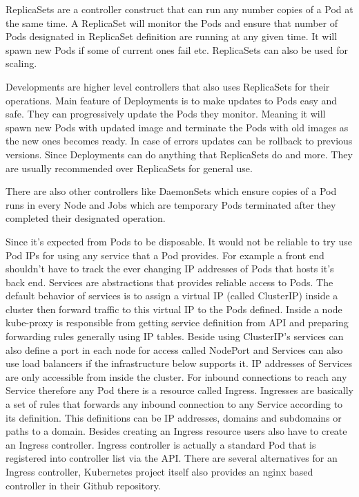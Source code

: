 \documentclass[12pt,oneandhalf,chaparabic,ceng,ms,eng,oneside,pntc]{gsufbe}
\begin{document}
ReplicaSets are a controller construct that can run any number copies of a Pod at the same time.  A 
ReplicaSet will monitor the Pods and ensure that number of Pods designated in ReplicaSet definition are
running at any given time.  It will spawn new Pods if some of current ones fail etc. ReplicaSets can
also be used for scaling.  

Developments are higher level controllers that also uses ReplicaSets for their operations.  Main feature
of Deployments is to make updates to Pods easy and safe.  They can progressively update the Pods they
monitor.  Meaning it will spawn new Pods with updated image and terminate the Pods with old images as
the new ones becomes ready.  In case of errors updates can be rollback to previous versions.  Since
Deployments can do anything that ReplicaSets do and more.  They are usually recommended over ReplicaSets
for general use.

There are also other controllers like DaemonSets which ensure copies of a Pod runs in every Node and
Jobs which are temporary Pods terminated after they completed their designated operation.

Since it’s expected from Pods to be disposable.  It would not be reliable to try use Pod IPs for using
any service that a Pod provides.  For example a front end shouldn’t have to track the ever changing IP
addresses of Pods that hosts it’s back end.  Services are abstractions that provides reliable access to
Pods.  The default behavior of services is to assign a virtual IP (called ClusterIP) inside a cluster
then forward traffic to this virtual IP to the Pods defined.  Inside a node kube-proxy is responsible
from getting service definition from API and preparing forwarding rules generally using IP tables.
Beside using ClusterIP’s services can also define a port in each node for access called NodePort and
Services can also use load balancers if the infrastructure below supports it.  
\cite{marmol_networking_2015}
IP addresses of Services are only accessible from inside the cluster.  For inbound connections to reach
any Service therefore any Pod there is a resource called Ingress.  Ingresses are basically a set of rules
that forwards any inbound connection to any Service according to its definition.  This definitions can
be IP addresses, domains and subdomains or paths to a domain.  Besides creating an Ingress resource
users also have to create an Ingress controller.  Ingress controller is actually a standard Pod that is
registered into controller list via the API.  There are several alternatives for an Ingress controller,
Kubernetes project itself also provides an nginx based controller in their Github repository.
\end{document}

